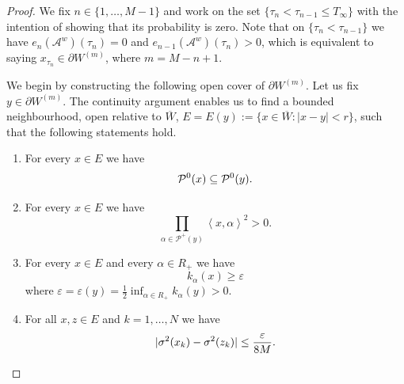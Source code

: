 \documentclass{article}
\numberwithin{equation}{section}
\newcommand{\C}{W}
\newcommand{\Cbm}{\partial \C^{(m)}}
\newcommand{\Aa}{\mathcal{A}^{w}}
\newcommand{\xa}{\left<x,\alpha\right>}
\newcommand{\aR}{\alpha\in R_+}
\newcommand{\eA}[1]{e_{#1}(\Aa)}
\newcommand{\Pzero}{\mathcal{P}^0(y)}
\newcommand{\Pplus}{\mathcal{P}^+(y)}
\newcommand{\Pzerox}{\mathcal{P}^0(x)}
\newcommand{\lifetime}{T_\infty}
\theoremstyle{plain}
\begin{document}
\begin{proof}
        We fix $n\in\{1,\ldots,M-1\}$ and work on the set $\{\tau_{n}<\tau_{n-1}\leq\lifetime\}$ with the intention of showing that its probability is zero.
		Note that on $\{\tau_{n}<\tau_{n-1}\}$ we have $\eA{n}(\tau_{n})=0$ and $\eA{n-1}(\tau_{n})>0$, which is equivalent to saying $x_{\tau_n} \in \Cbm$, where $m=M-n+1$.

        \medskip

		We begin by constructing the following open cover of $\Cbm$. Let us fix $y\in \Cbm$. The continuity argument enables us to find a bounded neighbourhood, open relative to $\overline W$, $E=E(y):=\{x\in\overline W:|x-y|<r\}$, such that the following statements hold.
        
		\begin{enumerate}[label=(\roman*)]
			\item \label{eq:Pzero:inclusion}For every $x\in E$ we have 
				\begin{equation*}
					\Pzerox \subseteq \Pzero\/.
				\end{equation*}
			\item \label{eq:Hplus:condition}
                For every $x\in E$ we have
			  \begin{equation*}
					\prod_{\alpha\in \Pplus} \xa^2>0.
				\end{equation*}   
			\item \label{eq:k:lowerbound} For every $x\in E$ and every $\alpha\in R_+$ we have
				\begin{equation*}
					k_\alpha(x)\geq \varepsilon
				\end{equation*}
				where $\varepsilon = \varepsilon(y) = \frac{1}{2}\inf_{\aR} k_\alpha(y)>0$.
            \item \label{eq:sigma:uniform} For all $x,z\in E$ and $k=1,\ldots,N$ we have
                    \begin{equation*}
                        |\sigma^2(x_k)-\sigma^2(z_k)|\leq \frac{\varepsilon}{8M}\/.
                    \end{equation*}


\end{enumerate}
\end{proof}
\end{document}
